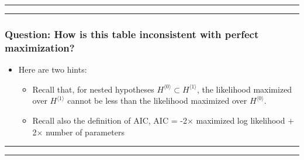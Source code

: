 \documentclass[]{article}
\begin{document}
\begin{center}\rule{0.5\linewidth}{\linethickness}\end{center}

\begin{center}\rule{0.5\linewidth}{\linethickness}\end{center}

\subsubsection{Question: How is this table inconsistent with perfect
maximization?}\label{question-how-is-this-table-inconsistent-with-perfect-maximization}

\begin{itemize}
\item
  Here are two hints:

  \begin{itemize}
  \item
    Recall that, for nested hypotheses
    \(H^{\langle 0\rangle}\subset H^{\langle 1\rangle}\), the likelihood
    maximized over \(H^{\langle 1\rangle}\) cannot be less than the
    likelihood maximized over \(H^{\langle 0\rangle}\).
  \item
    Recall also the definition of AIC, AIC = -2\(\times\) maximized log
    likelihood \(+\) 2\(\times\) number of parameters
  \end{itemize}
\end{itemize}


\begin{center}\rule{0.5\linewidth}{\linethickness}\end{center}

\begin{center}\rule{0.5\linewidth}{\linethickness}\end{center}
\end{document}
